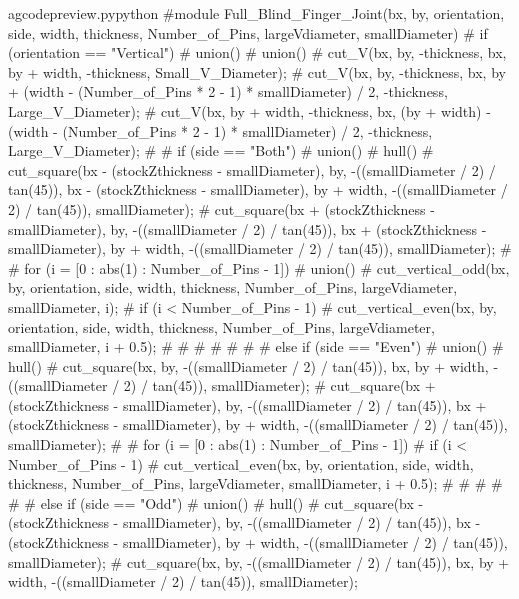\documentclass{ltxdoc}
\begin{document}
\lstset{firstnumber=\thegcpy}
\begin{writecode}{a}{gcodepreview.py}{python}
#module Full_Blind_Finger_Joint(bx, by, orientation, side, width, thickness, Number_of_Pins, largeVdiameter, smallDiameter) {
#  if (orientation == "Vertical") {
#    union(){
#      union(){
#        cut_V(bx, by, -thickness, bx, by + width, -thickness, Small_V_Diameter);
#        cut_V(bx, by, -thickness, bx, by + (width - (Number_of_Pins * 2 - 1) * smallDiameter) / 2, -thickness, Large_V_Diameter);
#        cut_V(bx, by + width, -thickness, bx, (by + width) - (width - (Number_of_Pins * 2 - 1) * smallDiameter) / 2, -thickness, Large_V_Diameter);
#      }
#      if (side == "Both") {
#        union(){
#          hull(){
#            cut_square(bx - (stockZthickness - smallDiameter), by, -((smallDiameter / 2) / tan(45)), bx - (stockZthickness - smallDiameter), by + width, -((smallDiameter / 2) / tan(45)), smallDiameter);
#            cut_square(bx + (stockZthickness - smallDiameter), by, -((smallDiameter / 2) / tan(45)), bx + (stockZthickness - smallDiameter), by + width, -((smallDiameter / 2) / tan(45)), smallDiameter);
#          }
#          for (i = [0 : abs(1) : Number_of_Pins - 1]) {
#            union(){
#              cut_vertical_odd(bx, by, orientation, side, width, thickness, Number_of_Pins, largeVdiameter, smallDiameter, i);
#              if (i < Number_of_Pins - 1) {
#                cut_vertical_even(bx, by, orientation, side, width, thickness, Number_of_Pins, largeVdiameter, smallDiameter, i + 0.5);
#              }
#
#            }
#          }
#
#        }
#      } else if (side == "Even") {
#        union(){
#          hull(){
#            cut_square(bx, by, -((smallDiameter / 2) / tan(45)), bx, by + width, -((smallDiameter / 2) / tan(45)), smallDiameter);
#            cut_square(bx + (stockZthickness - smallDiameter), by, -((smallDiameter / 2) / tan(45)), bx + (stockZthickness - smallDiameter), by + width, -((smallDiameter / 2) / tan(45)), smallDiameter);
#          }
#          for (i = [0 : abs(1) : Number_of_Pins - 1]) {
#            if (i < Number_of_Pins - 1) {
#              cut_vertical_even(bx, by, orientation, side, width, thickness, Number_of_Pins, largeVdiameter, smallDiameter, i + 0.5);
#            }
#
#          }
#
#        }
#      } else if (side == "Odd") {
#        union(){
#          hull(){
#            cut_square(bx - (stockZthickness - smallDiameter), by, -((smallDiameter / 2) / tan(45)), bx - (stockZthickness - smallDiameter), by + width, -((smallDiameter / 2) / tan(45)), smallDiameter);
#            cut_square(bx, by, -((smallDiameter / 2) / tan(45)), bx, by + width, -((smallDiameter / 2) / tan(45)), smallDiameter);
}}}}}}
\end{writecode}
\end{document}
